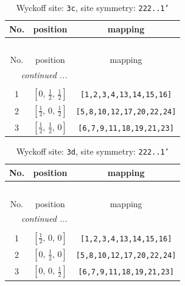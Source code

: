 \documentclass[fleqn,8pt]{jsarticle}
\begin{document}
\begin{longtable}{ccc}
\caption{Wyckoff site: {\tt 3c}, site symmetry: {\tt 222..1'}}
 \\
 \hline \hline
No. & position & mapping \\ \hline \endfirsthead

\multicolumn{2}{l}{\tablename\ \thetable{}} \\
 \hline \hline
No. & position & mapping \\ \hline \endhead

 \hline \hline
\multicolumn{2}{r}{\footnotesize\it continued ...} \\ \endfoot

 \hline \hline
\multicolumn{2}{r}{} \\ \endlastfoot

1 & $\left[ 0,\, \frac{1}{2},\, \frac{1}{2} \right]$ & {\tt [1,2,3,4,13,14,15,16]} \\ \hline
2 & $\left[ \frac{1}{2},\, 0,\, \frac{1}{2} \right]$ & {\tt [5,8,10,12,17,20,22,24]} \\ \hline
3 & $\left[ \frac{1}{2},\, \frac{1}{2},\, 0 \right]$ & {\tt [6,7,9,11,18,19,21,23]} \\
\end{longtable}
\renewcommand{\arraystretch}{1.2}
\begin{longtable}{ccc}
\caption{Wyckoff site: {\tt 3d}, site symmetry: {\tt 222..1'}}
 \\
 \hline \hline
No. & position & mapping \\ \hline \endfirsthead

\multicolumn{2}{l}{\tablename\ \thetable{}} \\
 \hline \hline
No. & position & mapping \\ \hline \endhead

 \hline \hline
\multicolumn{2}{r}{\footnotesize\it continued ...} \\ \endfoot

 \hline \hline
\multicolumn{2}{r}{} \\ \endlastfoot

1 & $\left[ \frac{1}{2},\, 0,\, 0 \right]$ & {\tt [1,2,3,4,13,14,15,16]} \\ \hline
2 & $\left[ 0,\, \frac{1}{2},\, 0 \right]$ & {\tt [5,8,10,12,17,20,22,24]} \\ \hline
3 & $\left[ 0,\, 0,\, \frac{1}{2} \right]$ & {\tt [6,7,9,11,18,19,21,23]} \\
\end{longtable}
\renewcommand{\arraystretch}{1.2}
\end{document}
